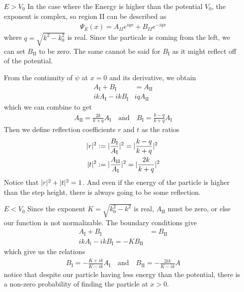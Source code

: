 \begin{itemize}
	\item[$E > V_0$] In the case where the Energy is higher than the potential $V_0$, the exponent is complex, so region II can be described as
	\begin{align*}
		\Psi_E(x) = A_{II}e^{iqx} + B_{II}e^{-iqx}
	\end{align*}
	where $q = \sqrt{k^{2}-k_0^{2}}$ is real. Since the particale is coming from the left, we can set $B_{\text{II}}$ to be zero. The same cannot be said for $B_{\text{I}}$ as it might reflect off of the potential. 
	
	From the continuity of $\psi$ at $x = 0$ and its derivative, we obtain
	\begin{align*}
		A_{\text{I}} + B_{\text{I}} &= A_{\text{II}}\\
		ik A_{\text{I}} - ik B_{\text{I}} & iq A_{\text{II}}
	\end{align*}
	which we can combine to get
	\begin{align*}
		A_{\text{II}} = \frac{2k}{k+q}A_{\text{I}} \quad \text{and} \quad B_{\text{I}} = \frac{k-q}{k+q} A_{\text{I}}
	\end{align*}
	Then we define reflection coefficients $r$ and $t$ as the ratios
	\begin{align*}
		\vert r\vert^{2} &:= \vert\frac{B_{\text{I}}}{A_{\text{I}}}\vert^{2} = \vert\frac{k-q}{k+q}\vert^{2}\\
		\vert t\vert^{2} &:= \vert\frac{A_{\text{II}}}{A_{\text{I}}}\vert^{2} = \vert\frac{2k}{k+q}\vert^{2}
	\end{align*}
	Notice that $\vert r\vert^{2} + \vert t\vert^{2} = 1$. And even if the energy of the particle is higher than the step height, there is always going to be some reflection.

\item[$E < V_0$] Since the exponent $K = \sqrt{k_0^{2} - k^{2}}$ is real, $A_{\text{II}}$ must be zero, or else our function is not normalizable.
	The boundary conditions give
	\begin{align*}
		A_{\text{I}} + B_{\text{I}} &= B_{\text{II}}\\
		ikA_{\text{i}} - ikB_{\text{I}} = -K B_{\text{II}}
	\end{align*}
	which give us the relations
	\begin{align*}
		B_{\text{I}} = -\frac{K + ik}{K - ik}A_{\text{I}} \quad \text{and} \quad B_{\text{II}} = - \frac{2ik}{K - ik}A
	\end{align*}
	notice that despite our particle having less energy than the potential, there is a non-zero probability of finding the particle at $x > 0$.
\end{itemize}



